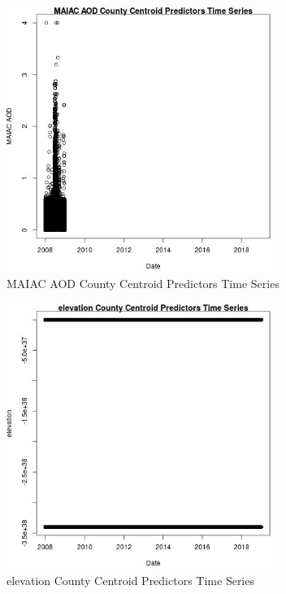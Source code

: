 \begin{figure} 
\centering  
\includegraphics[width=0.77\textwidth]{Code_Outputs/df_report_ML_predictors_CountyCentroid_Locations_Dates_2008-01-01to2018-12-31_MAIAC_AODvDate.jpg} 
\caption{\label{fig:df_report_ML_predictors_CountyCentroid_Locations_Dates_2008-01-01to2018-12-31MAIAC_AODvDate}MAIAC AOD County Centroid Predictors Time Series} 
\end{figure} 
 

\begin{figure} 
\centering  
\includegraphics[width=0.77\textwidth]{Code_Outputs/df_report_ML_predictors_CountyCentroid_Locations_Dates_2008-01-01to2018-12-31_elevationvDate.jpg} 
\caption{\label{fig:df_report_ML_predictors_CountyCentroid_Locations_Dates_2008-01-01to2018-12-31elevationvDate}elevation County Centroid Predictors Time Series} 
\end{figure} 
 

